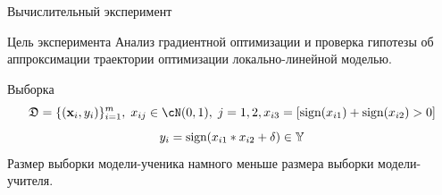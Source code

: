 \documentclass[10pt, aspectratio=169]{beamer}
\begin{document}
\begin{frame}{Вычислительный эксперимент}
\begin{block}{Цель эксперимента}
Анализ градиентной оптимизации и проверка гипотезы об аппроксимации траектории оптимизации локально-линейной моделью.
\end{block}
\begin{block}{Выборка}
$$\fD = \{(\bx_i, y_i)\}_{i=1}^{m},\; x_{ij} \in \cN(0, 1),\; j=1, 2, x_{i3} = [\text{sign}(x_{i1})+\text{sign}(x_{i2})>0]$$
$$y_i = \text{sign}(x_{i1}*x_{i2}+\delta) \in \mathbb{Y}$$
Размер выборки модели-ученика намного меньше размера выборки модели-учителя.
\end{block}
\begin{figure}
    \fontsize{5}{5}\selectfont
    \begin{minipage}[h]{0.3\linewidth}
    \end{minipage}
    \begin{minipage}[h]{0.3\linewidth}

\end{minipage}
\end{figure}
\end{frame}
\end{document}

